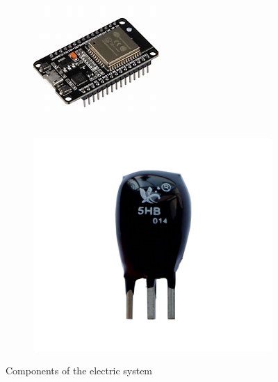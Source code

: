 \documentclass[twoside]{article}
\begin{document}
\begin{figure}[H]
\begin{subfigure}[b]{0.33\linewidth}
		\includegraphics[width=\textwidth]{esp32}
	\end{subfigure}%
	\begin{subfigure}[b]{0.33\linewidth}
		\centering
		\includegraphics[width=\textwidth]{relay}
	\end{subfigure}
	\caption{Components of the electric system}
\end{figure}
\end{document}
